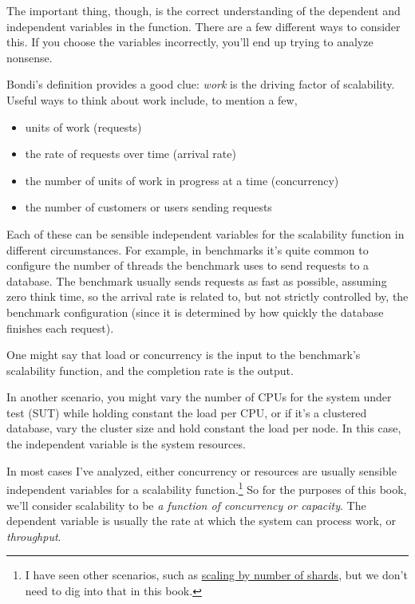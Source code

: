\documentclass{vivid_layout_pdf}
\begin{document}
The important thing, though, is the correct understanding of the dependent and
independent variables in the function. There are a few different ways to
consider this. If you choose the variables incorrectly, you'll end up trying to
analyze nonsense.

Bondi's definition provides a good clue: {\itshape work} is the driving factor
of scalability. Useful ways to think about work include, to mention a few,

\begin{itemize}
\item units of work (requests)
\item the rate of requests over time (arrival rate)
\item the number of units of work in progress at a time (concurrency)
\item the number of customers or users sending requests
\end{itemize}

Each of these can be sensible independent variables for the scalability function
in different circumstances. For example, in benchmarks it's quite common to
configure the number of threads the benchmark uses to send requests to a
database. The benchmark usually sends requests as fast as possible, assuming
zero think time, so the arrival rate is related to, but not strictly controlled
by, the benchmark configuration (since it is determined by how quickly the database finishes each request).

One might say that load or concurrency is the input to the benchmark's
scalability function, and the completion rate is the output.

In another scenario, you might vary the number of CPUs for the system under test
(SUT) while holding constant the load per CPU, or if it's a clustered database,
vary the cluster size and hold constant the load per node. In this case, the
independent variable is the system resources.

In most cases I've analyzed, either concurrency or resources are usually
sensible independent variables for a scalability function.\footnote{I have seen
other scenarios, such as
\href{https://www.percona.com/blog/2011/02/28/is-voltdb-really-as-scalable-as-they-claim/}{scaling by number of shards}, but we don't need to dig into that in this book.} So for
the purposes of this book, we'll consider scalability to be {\itshape a function
of concurrency or capacity}. The dependent variable is usually the rate at which
the system can process work, or {\itshape throughput}.
\end{document}
